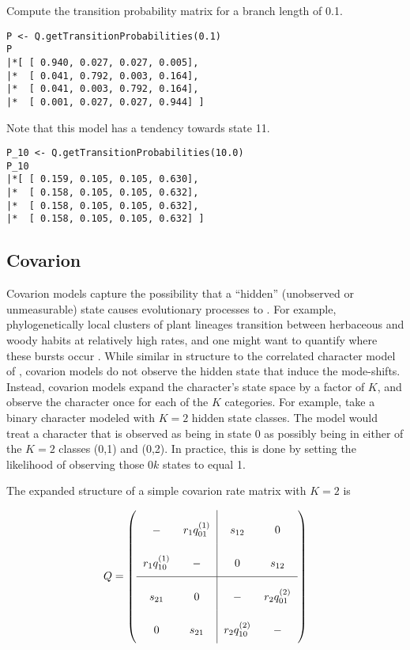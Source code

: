 Compute the transition probability matrix for a branch length of 0.1.

{\tt \begin{snugshade*}
\begin{lstlisting}
P <- Q.getTransitionProbabilities(0.1)
P
|*[ [ 0.940, 0.027, 0.027, 0.005],
|*  [ 0.041, 0.792, 0.003, 0.164],
|*  [ 0.041, 0.003, 0.792, 0.164],
|*  [ 0.001, 0.027, 0.027, 0.944] ]
\end{lstlisting}
\end{snugshade*}}

Note that this model has a tendency towards state 11.

{\tt \begin{snugshade*}
\begin{lstlisting}
P_10 <- Q.getTransitionProbabilities(10.0)
P_10
|*[ [ 0.159, 0.105, 0.105, 0.630],
|*  [ 0.158, 0.105, 0.105, 0.632],
|*  [ 0.158, 0.105, 0.105, 0.632],
|*  [ 0.158, 0.105, 0.105, 0.632] ]
\end{lstlisting}
\end{snugshade*}}


\subsection{Covarion}

Covarion models \citep{tuffley98} capture the possibility that a ``hidden'' (unobserved or unmeasurable) state causes evolutionary processes to .
For example, phylogenetically local clusters of plant lineages transition between herbaceous and woody habits at relatively high rates, and one might want to quantify where these bursts occur \citep{beaulieu2013}.
While similar in structure to the correlated character model of \citet{pagel94}, covarion models do not observe the hidden state that induce the mode-shifts.
Instead, covarion models expand the character's state space by a factor of $K$, and observe the character once for each of the $K$ categories.
For example, take a binary character modeled with $K=2$ hidden state classes.
The model would treat a character that is observed as being in state 0 as possibly being in either of the $K=2$ classes (0,1) and (0,2).
In practice, this is done by setting the likelihood of observing those $0k$ states to equal 1.

The expanded structure of a simple covarion rate matrix with $K=2$ is

\begin{equation*}
Q = \left(
\arraycolsep=6pt\def\arraystretch{2.5}
\begin{array}{cc|cc}
- & r_1 q_{01}^{(1)} & s_{12} & 0 \\
r_1 q_{10}^{(1)} & - & 0 & s_{12} \\
\hline
s_{21} & 0 & - & r_2 q_{01}^{(2)} \\
0 & s_{21} & r_2 q_{10}^{(2)} & -  \\

\end{array}
\right)    
\end{equation*}

